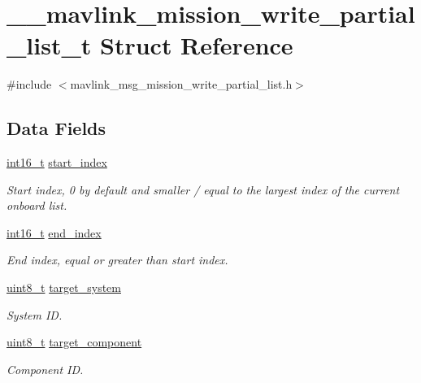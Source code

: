 \hypertarget{struct____mavlink__mission__write__partial__list__t}{\section{\-\_\-\-\_\-mavlink\-\_\-mission\-\_\-write\-\_\-partial\-\_\-list\-\_\-t Struct Reference}
\label{struct____mavlink__mission__write__partial__list__t}
}


{\ttfamily \#include $<$mavlink\-\_\-msg\-\_\-mission\-\_\-write\-\_\-partial\-\_\-list.\-h$>$}

\subsection*{Data Fields}
\begin{DoxyCompactItemize}
\item 
\hyperlink{stdint_8h_aa343fa3b3d06292b959ffdd4c4703b06}{int16\-\_\-t} \hyperlink{struct____mavlink__mission__write__partial__list__t_a7001c48ce5da88acadbcbe40a56a0e43}{start\-\_\-index}
\begin{DoxyCompactList}\small\item\em Start index, 0 by default and smaller / equal to the largest index of the current onboard list. \end{DoxyCompactList}\item 
\hyperlink{stdint_8h_aa343fa3b3d06292b959ffdd4c4703b06}{int16\-\_\-t} \hyperlink{struct____mavlink__mission__write__partial__list__t_a98971b77ca596d8a92837a0836abf489}{end\-\_\-index}
\begin{DoxyCompactList}\small\item\em End index, equal or greater than start index. \end{DoxyCompactList}\item 
\hyperlink{stdint_8h_aba7bc1797add20fe3efdf37ced1182c5}{uint8\-\_\-t} \hyperlink{struct____mavlink__mission__write__partial__list__t_aa5e77ea55d7e908035fab2d1b0beb898}{target\-\_\-system}
\begin{DoxyCompactList}\small\item\em System I\-D. \end{DoxyCompactList}\item 
\hyperlink{stdint_8h_aba7bc1797add20fe3efdf37ced1182c5}{uint8\-\_\-t} \hyperlink{struct____mavlink__mission__write__partial__list__t_a3e0c142d5a465fe2bf22e8c728be4a58}{target\-\_\-component}
\begin{DoxyCompactList}\small\item\em Component I\-D. \end{DoxyCompactList}\end{DoxyCompactItemize}


